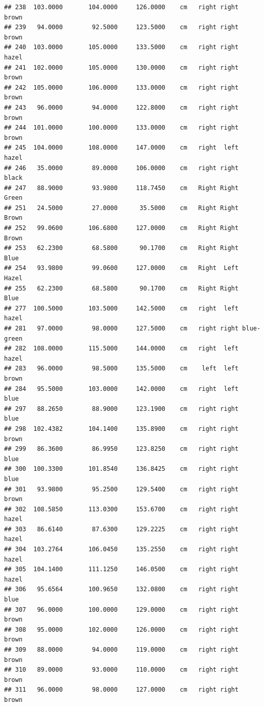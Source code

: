 \documentclass[]{article}
\begin{document}
\begin{verbatim}
## 238  103.0000       104.0000     126.0000    cm   right right      brown
## 239   94.0000        92.5000     123.5000    cm   right right      brown
## 240  103.0000       105.0000     133.5000    cm   right right      hazel
## 241  102.0000       105.0000     130.0000    cm   right right      brown
## 242  105.0000       106.0000     133.0000    cm   right right      brown
## 243   96.0000        94.0000     122.8000    cm   right right      brown
## 244  101.0000       100.0000     133.0000    cm   right right      brown
## 245  104.0000       108.0000     147.0000    cm   right  left      hazel
## 246   35.0000        89.0000     106.0000    cm   right right      black
## 247   88.9000        93.9800     118.7450    cm   Right Right      Green
## 251   24.5000        27.0000      35.5000    cm   Right Right      Brown
## 252   99.0600       106.6800     127.0000    cm   Right Right      Brown
## 253   62.2300        68.5800      90.1700    cm   Right Right       Blue
## 254   93.9800        99.0600     127.0000    cm   Right  Left      Hazel
## 255   62.2300        68.5800      90.1700    cm   Right Right       Blue
## 277  100.5000       103.5000     142.5000    cm   right  left      hazel
## 281   97.0000        98.0000     127.5000    cm   right right blue-green
## 282  108.0000       115.5000     144.0000    cm   right  left      hazel
## 283   96.0000        98.5000     135.5000    cm    left  left      brown
## 284   95.5000       103.0000     142.0000    cm   right  left       blue
## 297   88.2650        88.9000     123.1900    cm   right right       blue
## 298  102.4382       104.1400     135.8900    cm   right right      brown
## 299   86.3600        86.9950     123.8250    cm   right right       blue
## 300  100.3300       101.8540     136.8425    cm   right right       blue
## 301   93.9800        95.2500     129.5400    cm   right right      brown
## 302  108.5850       113.0300     153.6700    cm   right right      hazel
## 303   86.6140        87.6300     129.2225    cm   right right      hazel
## 304  103.2764       106.0450     135.2550    cm   right right      hazel
## 305  104.1400       111.1250     146.0500    cm   right right      hazel
## 306   95.6564       100.9650     132.0800    cm   right right       blue
## 307   96.0000       100.0000     129.0000    cm   right right      brown
## 308   95.0000       102.0000     126.0000    cm   right right      brown
## 309   88.0000        94.0000     119.0000    cm   right right      brown
## 310   89.0000        93.0000     110.0000    cm   right right      brown
## 311   96.0000        98.0000     127.0000    cm   right right      brown

\end{verbatim}
\end{document}
